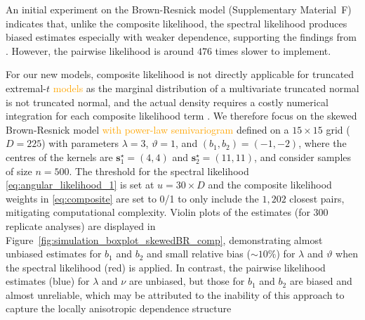 \documentclass[12pt]{article}
\newcommand{\PZ}{\textcolor{orange}}
\begin{document}
An initial experiment on the Brown-Resnick model (Supplementary Material~F) 
indicates that, unlike the composite likelihood, the spectral likelihood produces biased estimates especially with weaker dependence, supporting the findings from \citet{Engelke.etal:2015, Huser.etal:2016}. 
However, the pairwise likelihood 
is around $476$ times slower to implement.
%

For our new models, composite likelihood is not directly applicable for truncated extremal-$t$ \PZ{models} as the marginal distribution of a multivariate truncated normal is not truncated normal, and the actual density requires a costly numerical integration for each composite likelihood term \citep{Horrace:2005}. 
%
We therefore focus on the skewed Brown-Resnick model \PZ{with power-law semivariogram}  defined on a $15\times15$ grid  ($D=225$) with parameters $\lambda=3$, $\vartheta=1$, and $(b_1,b_2) = (-1,-2)$, where the centres of the kernels are 
$\bm s_1^\star = (4,4)$ and $\bm s_2^\star=(11,11)$, and consider samples of size $n=500$. 
%
The threshold for the spectral likelihood \eqref{eq:angular_likelihood_1} is set at $u = 30 \times D$ and the composite likelihood weights in 
\eqref{eq:composite} are set to 0/1 to
only include the $1,202$ closest pairs, mitigating computational complexity.
% 
Violin plots of the estimates (for 300 replicate analyses) are displayed in Figure~\ref{fig:simulation_boxplot_skewedBR_comp}, demonstrating almost unbiased estimates for $b_1$ and $b_2$ and small relative bias (${\sim}10\%$) for $\lambda$ and $\vartheta$ when the spectral likelihood (red) is applied. 
%
In contrast, the pairwise likelihood estimates (blue) for $\lambda$ and $\nu$ are unbiased, but those for $b_1$ and $b_2$ are biased and almost unreliable, which may be attributed to the inability of this approach to capture the locally anisotropic dependence structure 
\end{document}
